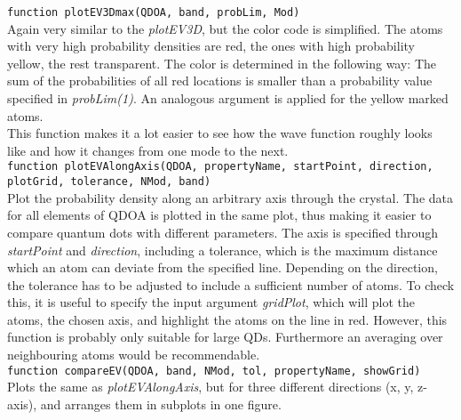 \lstinline{function plotEV3Dmax(QDOA, band, probLim, Mod)}\\

Again very similar to the \textit{plotEV3D}, but the color code is simplified. The atoms with very high probability densities are red, the ones with high probability yellow, the rest transparent. The color is determined in the following way: The sum of the probabilities of all red locations is smaller than a probability value specified in \textit{probLim(1)}. An analogous argument is applied for the yellow marked atoms.\\
This function makes it a lot easier to see how the wave function roughly looks like and how it changes from one mode to the next.\\

\lstinline{function plotEVAlongAxis(QDOA, propertyName, startPoint, direction, plotGrid, tolerance, NMod, band)}\\

Plot the probability density along an arbitrary axis through the crystal. The data for all elements of QDOA is plotted in the same plot, thus making it easier to compare quantum dots with different parameters. The axis is specified through \textit{startPoint} and \textit{direction}, including a tolerance, which is  the maximum distance which an atom can deviate from the specified line. Depending on the direction, the tolerance has to be adjusted to include  a sufficient number of atoms. To check this, it is useful to specify the input argument \textit{gridPlot}, which will plot the atoms, the chosen axis, and highlight  the atoms on the line in red. However, this function is probably only suitable for large QDs. Furthermore an averaging over neighbouring atoms  would be recommendable.\\ 
 
\lstinline{function compareEV(QDOA, band, NMod, tol, propertyName, showGrid)}\\

Plots the same as \textit{plotEVAlongAxis}, but for three different directions (x, y, z-axis), and arranges them in subplots in one figure.
